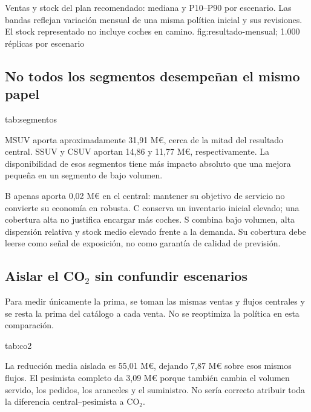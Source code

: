 {Ventas y stock del plan recomendado: mediana y P10--P90 por escenario.
Las bandas reflejan variación mensual de una misma política inicial y sus
revisiones. El stock representado no incluye coches en camino.}
{fig:resultado-mensual}{; 1.000 réplicas por escenario}

\subsection{No todos los segmentos desempeñan el mismo papel}
{tab:segmentos}{}

MSUV aporta aproximadamente 31,91 M\euro{}, cerca de la mitad del resultado
central. SSUV y CSUV aportan 14,86 y 11,77 M\euro{}, respectivamente. La
disponibilidad de esos segmentos tiene más impacto absoluto que una mejora
pequeña en un segmento de bajo volumen.

B apenas aporta 0,02 M\euro{} en el central: mantener su objetivo de servicio
no convierte su economía en robusta. C conserva un inventario inicial elevado;
una cobertura alta no justifica encargar más coches. S combina bajo volumen,
alta dispersión relativa y stock medio elevado frente a la demanda. Su cobertura
debe leerse como señal de exposición, no como garantía de calidad de previsión.

\subsection{Aislar el CO\texorpdfstring{$_2$}{2} sin confundir escenarios}
Para medir únicamente la prima, se toman las mismas ventas y flujos centrales
y se resta la prima del catálogo a cada venta. No se reoptimiza la política
en esta comparación.

{tab:co2}{}

La reducción media aislada es 55,01 M\euro{}, dejando 7,87 M\euro{} sobre esos
mismos flujos. El pesimista completo da 3,09 M\euro{} porque también cambia
el volumen servido, los pedidos, los aranceles y el suministro. No sería
correcto atribuir toda la diferencia central--pesimista a CO$_2$.

